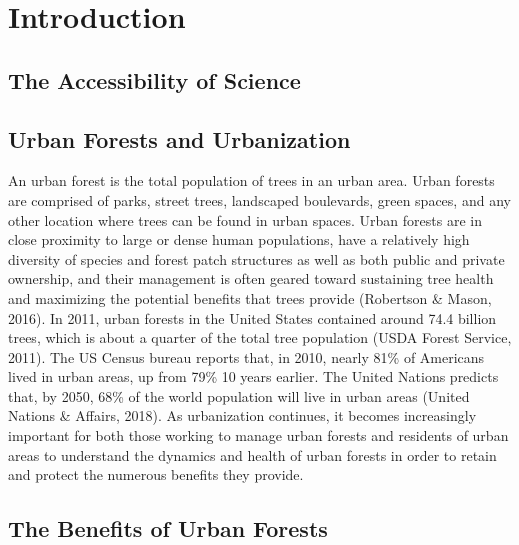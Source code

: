 \documentclass[12pt,twoside]{reedthesis}
\begin{document}
\hypertarget{intro}{%
\chapter{Introduction}\label{intro}}

\hypertarget{the-accessibility-of-science}{%
\section{The Accessibility of Science}\label{the-accessibility-of-science}}

\hypertarget{urban-forests-and-urbanization}{%
\section{Urban Forests and Urbanization}\label{urban-forests-and-urbanization}}

An urban forest is the total population of trees in an urban area. Urban forests are comprised of parks, street trees, landscaped boulevards, green spaces, and any other location where trees can be found in urban spaces. Urban forests are in close proximity to large or dense human populations, have a relatively high diversity of species and forest patch structures as well as both public and private ownership, and their management is often geared toward sustaining tree health and maximizing the potential benefits that trees provide (Robertson \& Mason, 2016). In 2011, urban forests in the United States contained around 74.4 billion trees, which is about a quarter of the total tree population (USDA Forest Service, 2011). The US Census bureau reports that, in 2010, nearly 81\% of Americans lived in urban areas, up from 79\% 10 years earlier. The United Nations predicts that, by 2050, 68\% of the world population will live in urban areas (United Nations \& Affairs, 2018). As urbanization continues, it becomes increasingly important for both those working to manage urban forests and residents of urban areas to understand the dynamics and health of urban forests in order to retain and protect the numerous benefits they provide.

\hypertarget{the-benefits-of-urban-forests}{%
\section{The Benefits of Urban Forests}\label{the-benefits-of-urban-forests}}
\end{document}
